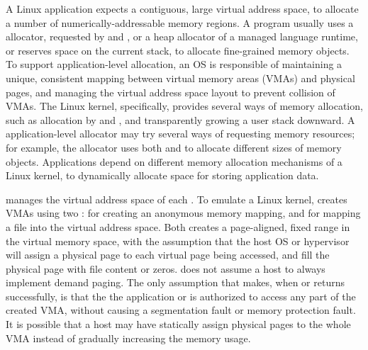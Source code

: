 \label{sec:libos:vma}


A Linux application expects a contiguous, large virtual address space,
to allocate a number of numerically-addressable memory regions.
A program usually uses a \libc{} allocator, requested by  and ,
or a heap allocator of a managed language runtime,
or reserves space on the current stack,
to allocate fine-grained memory objects.
To support application-level allocation,
an OS is responsible of
maintaining a unique, consistent mapping between virtual memory areas (VMAs) and physical pages,
and managing the virtual address space layout
to prevent collision of VMAs.
The Linux kernel, specifically, provides several ways of memory allocation, such as allocation by  and ,
and transparently growing a user stack downward. %
A application-level allocator may try several ways of requesting memory resources;
for example, the \glibc{} allocator
uses both  and  to allocate different sizes of memory objects.
Applications depend on different memory allocation mechanisms
of a Linux kernel,
to dynamically allocate space for storing application data.
 



\thelibos{} manages the virtual address space of each \picoproc{}.
To emulate a Linux kernel,
\thelibos{} creates VMAs using two \hostapis{}:
 for creating an anonymous memory mapping,
and  for mapping a file into the virtual address space.
Both \hostapis{} creates a page-aligned, fixed range in the
virtual memory space,
with the assumption that the host OS or hypervisor
will assign a physical page to each virtual page being accessed,
and fill the physical page with file content or zeros.
\thelibos{} does not assume
a host to always implement demand paging.
The only assumption that \thelibos{} makes, when  or  returns successfully,
is that 
the the application or 
\thelibos{} is authorized to access any part of the created VMA,
without causing a segmentation fault
or memory protection fault.
It is possible that a host may have statically assign
physical pages to the whole VMA instead of gradually increasing the memory usage.




